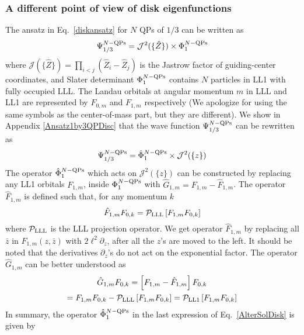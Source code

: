 \documentclass[prb,aps,epsfig,longbibliography,twocolumn]{revtex4-1}
\newcommand{\sbkt}[1]{\left[ #1\right]}
\begin{document}
\subsubsection{A different point of view of disk eigenfunctions} \label{altAnsatzDisKandSphere}
The ansatz in Eq.~\eqref{diskansatz} for $N$ QPs of $1/3$ can be written as
\begin{equation}
\Psi^{ N \rm -QPs}_{1/3}=\mathcal{J}^{2}(\{\hat{Z} \}) \times \Phi^{ N \rm-QPs}_{1} \label{1b3discAnsatz}
\end{equation}
where $\mathcal{J}(\{\hat{Z}\})=\prod_{i<j} (\hat{Z}_i - \hat{Z}_j)$ is the Jastrow factor of guiding-center coordinates, and Slater determinant $\Phi^{ N \rm-QPs}_{1}$ contains $N$ particles in LL1 with fully occupied LLL. The Landau orbitals at angular momentum $m$ in LLL and LL1 are represented by $F_{0,m}$ and $F_{1,m}$ respectively (We apologize for using the same symbols as the center-of-mass part, but they are different).  We show in Appendix \ref{Ansatz1by3QPDisc} that the wave function $\Psi^{ N \rm-QPs}_{1/3}$ can be rewritten as
\begin{equation}
\Psi^{ N\rm-QPs}_{1/3}= \hat\Phi^{ N\rm-QPs}_{1} \times {\mathcal{J}}^{2}(\{z\}) \label{AlterSolDisk}
\end{equation}
The operator $\hat\Phi^{ N\rm-QPs}_{1}$ which acts on $\mathcal{J}^{2}(\{z\})$ can be constructed by replacing any LL1 orbitals $F_{1,m}$, inside $\Phi^{ N\rm-QPs}_{1}$ with $\hat{G}_{1,m}=F_{1,m} -  \hat{F}_{1,m}$.  The operator $\hat{F}_{1,m}$ is  defined such that, for any momentum $k$
\begin{equation}
\hat{F}_{1,m}  F_{0,k}= \mathcal{P}_{\rm LLL} \sbkt{ F_{1,m}  F_{0,k}}
\end{equation}
where $ \mathcal{P}_{\rm LLL}$  is the LLL projection operator. We get operator $\hat{F}_{1,m}$ by replacing all $\bar{z}$ in  ${F}_{1,m}(z,\bar{z})$ with $2\ell^2\partial_z$, after all the $z$'s are moved to the left.\cite{Jain07} It should be noted that the derivatives $\partial_z$'s do not act on the exponential factor.  The operator $\hat{G}_{1,m}$ can be better understood as
\begin{gather}
\hat{G}_{1,m} F_{0,k}  = \sbkt{ F_{1,m} -  \hat{F}_{1,m} }  F_{0,k}\nonumber\\ 
= F_{1,m} F_{0,k}- \mathcal{P}_{\rm LLL} \sbkt{ F_{1,m} F_{0,k}}    = \mathcal{P}_{\rm LL1} \sbkt{ F_{1,m} F_{0,k}} \label{LL1proj}
\end{gather} 
In summary, the operator $\hat\Phi^{ N\rm-QPs}_{1}$ in the last expression of Eq.~\eqref{AlterSolDisk} is given by
\end{document}
